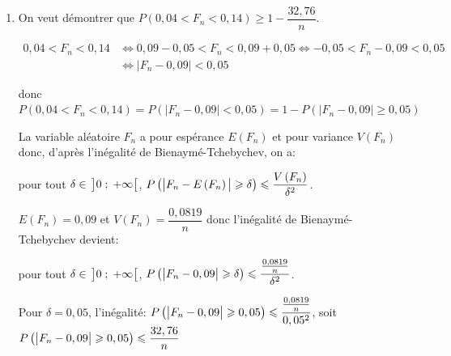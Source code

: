 \documentclass[10pt]{article}
\begin{document}
\begin{enumerate}
\begin{enumerate}

		\item On veut démontrer que $P\left (0,04 < F_n < 0,14\right ) \geqslant 1 - \dfrac{32,76}{n}$.

$\begin{aligned}
0,04 < F_n < 0,14
& \iff 0,09-0,05 < F_n < 0,09+0,05
\iff -0,05 < F_n-0,09 < 0,05\\
& \iff \left | F_n-0,09 \right | < 0,05
\end{aligned}$

donc 
$P\left (0,04 < F_n < 0,14\right ) = P\left (\left | F_n-0,09 \right | < 0,05\right ) = 1-P \left (\left | F_n-0,09 \right |\geqslant 0,05\right ) $

La variable aléatoire $F_n$ a pour espérance $E\left (F_n\right )$ et pour variance $V\left (F_n\right )$ donc, d'après l'inégalité de Bienaymé-Tchebychev, on a:

pour tout $\delta\in\, \left ]0\;;\;+\infty\strut \right [$, 
$P\left (\left |F_n-E\left (F_n\right)\strut \right | \geqslant \delta \right ) \leqslant \dfrac{V\left (F_n\right  )}{\delta^2}$.

$E\left (F_n\right )=0,09$ et $V\left (F_n\right )= \dfrac{0,0819}{n}$ donc  l'inégalité de Bienaymé-Tchebychev devient:

pour tout $\delta\in\, \left ]0\;;\;+\infty\strut \right [$, 
$P\left ( \left |F_n-0,09\strut \right | \geqslant \delta \right ) \leqslant \dfrac{\frac{0,0819}{n}}{\delta^2}$.

Pour $\delta=0,05$, l'inégalité:
$P\left ( \left |F_n-0,09\strut \right | \geqslant 0,05 \right ) \leqslant \dfrac{\frac{0,0819}{n}}{0,05^2}$,
soit
$P\left ( \left |F_n-0,09\strut \right | \geqslant 0,05 \right ) \leqslant \dfrac{32,76}{n}$		
		

\end{enumerate}
\end{enumerate}
\end{document}
